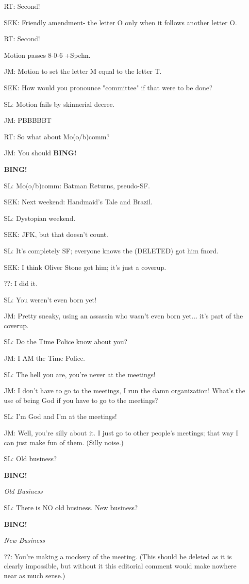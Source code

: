 \documentclass[12pt]{article}
\newcommand{\bing}{{\bf BING!} }
\newcommand{\goto}[1]{\bing \vskip 12pt \centerline{{\em{#1}}}}
\begin{document}
RT: Second!

SEK: Friendly amendment- the letter O only when it follows another letter O.

RT: Second!

Motion passes 8-0-6 +Spehn.

JM: Motion to set the letter M equal to the letter T.

SEK: How would you pronounce "committee" if that were to be done?

SL: Motion fails by skinnerial decree.

JM: PBBBBBT

RT: So what about Mo(o/b)comm?

JM: You should \bing

\bing

SL: Mo(o/b)comm: Batman Returns, pseudo-SF.

SEK: Next weekend: Handmaid's Tale and Brazil.

SL: Dystopian weekend.

SEK: JFK, but that doesn't count.

SL: It's completely SF; everyone knows the (DELETED) got him fnord.

SEK: I think Oliver Stone got him; it's just a coverup.

??: I did it.

SL: You weren't even born yet!

JM: Pretty sneaky, using an assassin who wasn't even born yet... it's part of the coverup.

SL: Do the Time Police know about you?

JM: I AM the Time Police.

SL: The hell you are, you're never at the meetings!

JM: I don't have to go to the meetings, I run the damn organization! What's the use of being God if you have to go to the meetings?

SL: I'm God and I'm at the meetings!

JM: Well, you're silly about it. I just go to other people's meetings; that way I can just make fun of them. (Silly noise.)

SL: Old business?

\goto{Old Business}

SL: There is NO old business. New business?

\goto{New Business}

??: You're making a mockery of the meeting. (This should be deleted as it is clearly impossible, but without it this editorial comment would make nowhere near as much sense.)
\end{document}
